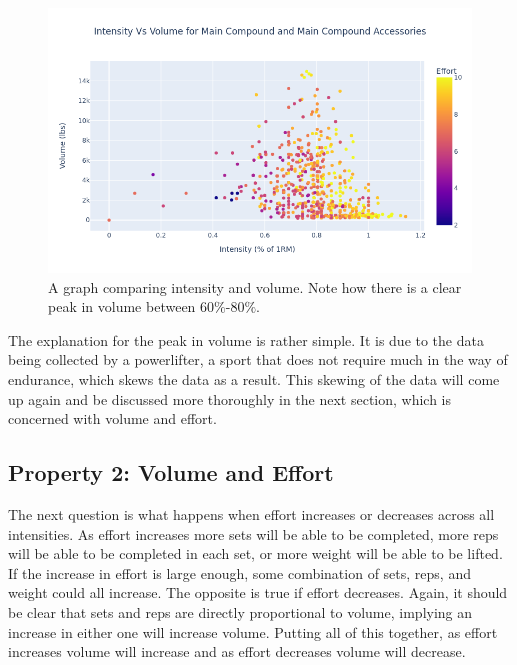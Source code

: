 \begin{figure}
    \centering
    \includegraphics[scale=0.55]{images/ch3/IntensityVsVolume.png}
    \caption{A graph comparing intensity and volume. Note how there is a clear peak in volume between $60\%$-$80\%$.} 
    \label{fig:IntensityVsVolumeGraph}
\end{figure}

The explanation for the peak in volume is rather simple. It is due to the data being collected by a powerlifter, a sport that does not require much in the way of endurance, which skews the data as a result. This skewing of the data will come up again and be discussed more thoroughly in the next section, which is concerned with volume and effort.


\subsection{Property 2: Volume and Effort}
\label{sec:PotentialSurfaceIntuitiveRelationshipsBetweenVariablesVolumeAndEffort}

The next question is what happens when effort increases or decreases across all intensities. As effort increases more sets will be able to be completed, more reps will be able to be completed in each set, or more weight will be able to be lifted. If the increase in effort is large enough, some combination of sets, reps, and weight could all increase. The opposite is true if effort decreases. Again, it should be clear that sets and reps are directly proportional to volume, implying an increase in either one will increase volume. Putting all of this together, as effort increases volume will increase and as effort decreases volume will decrease.

